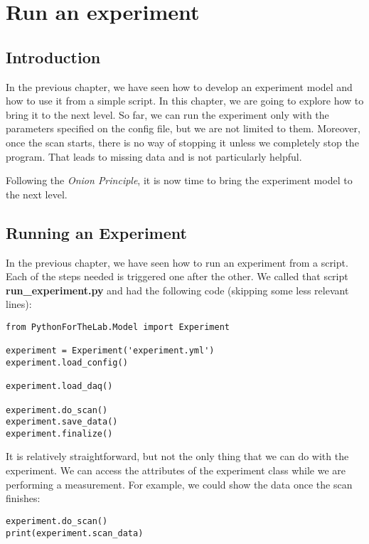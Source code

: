 \chapter{Run an experiment}\label{ch:run-experiment}


\section{Introduction}\label{sec:run-experiment-introduction}
In the previous chapter, we have seen how to develop an experiment model and how to use it from a simple script. In this chapter, we are going to explore how to bring it to the next level. So far, we can run the experiment only with the parameters specified on the config file, but we are not limited to them. Moreover, once the scan starts, there is no way of stopping it unless we completely stop the program. That leads to missing data and is not particularly helpful.

Following the \emph{Onion Principle}, it is now time to bring the experiment model to the next level.

\section{Running an Experiment}\label{sec:running-experiment}
In the previous chapter, we have seen how to run an experiment from a script. Each of the steps needed is triggered one after the other. We called that script \textbf{run\_experiment.py} and had the following code (skipping some less relevant lines):

\begin{verbatim}
from PythonForTheLab.Model import Experiment

experiment = Experiment('experiment.yml')
experiment.load_config()

experiment.load_daq()

experiment.do_scan()
experiment.save_data()
experiment.finalize()
\end{verbatim}

It is relatively straightforward, but not the only thing that we can do with the experiment. We can access the attributes of the experiment class while we are performing a measurement. For example, we could show the data once the scan finishes:

\begin{verbatim}
experiment.do_scan()
print(experiment.scan_data)
\end{verbatim}

